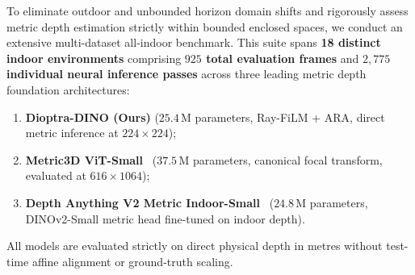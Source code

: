 To eliminate outdoor and unbounded horizon domain shifts and rigorously assess metric depth estimation strictly within bounded enclosed spaces, we conduct an extensive multi-dataset all-indoor benchmark. This suite spans \textbf{18 distinct indoor environments} comprising \textbf{$925$ total evaluation frames} and \textbf{$2{,}775$ individual neural inference passes} across three leading metric depth foundation architectures:
\begin{enumerate}
    \item \textbf{Dioptra-DINO (Ours)} ($25.4$\,M parameters, Ray-FiLM + ARA, direct metric inference at $224 \times 224$);
    \item \textbf{Metric3D ViT-Small}~\cite{yin2023metric3d} ($37.5$\,M parameters, canonical focal transform, evaluated at $616 \times 1064$);
    \item \textbf{Depth Anything V2 Metric Indoor-Small}~\cite{yang2024depth2} ($24.8$\,M parameters, DINOv2-Small metric head fine-tuned on indoor depth).
\end{enumerate}
All models are evaluated strictly on direct physical depth in metres without test-time affine alignment or ground-truth scaling.

